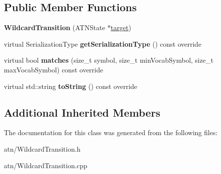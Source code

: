 \subsection*{Public Member Functions}
\begin{DoxyCompactItemize}
\item 
\mbox{\label{classantlr4_1_1atn_1_1WildcardTransition_a05cfc6031e8c187d1bedb8d6c0db9c72}} 
{\bfseries Wildcard\+Transition} (A\+T\+N\+State $\ast$\hyperlink{classantlr4_1_1atn_1_1Transition_aaaed7f4ddda71e156b36de33e88f66a7}{target})
\item 
\mbox{\label{classantlr4_1_1atn_1_1WildcardTransition_a99ac4e9394cb0281ae34bbe1fcadffbe}} 
virtual Serialization\+Type {\bfseries get\+Serialization\+Type} () const override
\item 
\mbox{\label{classantlr4_1_1atn_1_1WildcardTransition_aa2380c03587d9e6003877089f73afc94}} 
virtual bool {\bfseries matches} (size\+\_\+t symbol, size\+\_\+t min\+Vocab\+Symbol, size\+\_\+t max\+Vocab\+Symbol) const override
\item 
\mbox{\label{classantlr4_1_1atn_1_1WildcardTransition_aa576d5e643321e008d89ab4a7abbd0a6}} 
virtual std\+::string {\bfseries to\+String} () const override
\end{DoxyCompactItemize}
\subsection*{Additional Inherited Members}


The documentation for this class was generated from the following files\+:\begin{DoxyCompactItemize}
\item 
atn/Wildcard\+Transition.\+h\item 
atn/Wildcard\+Transition.\+cpp\end{DoxyCompactItemize}
